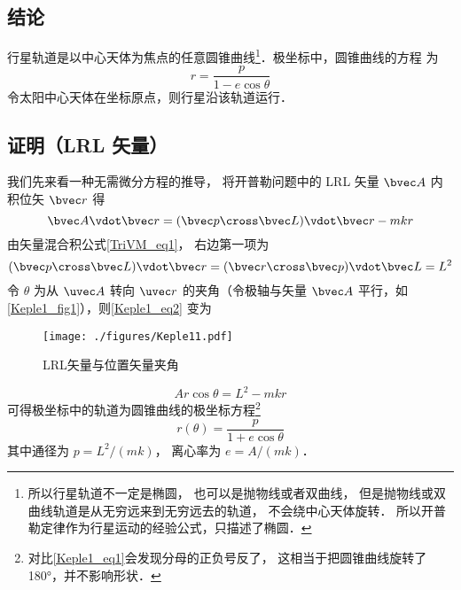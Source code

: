 

\subsection{结论}
行星轨道是以中心天体为焦点的任意圆锥曲线\footnote{所以行星轨道不一定是椭圆， 也可以是抛物线或者双曲线， 但是抛物线或双曲线轨道是从无穷远来到无穷远去的轨道， 不会绕中心天体旋转． 所以开普勒定律作为行星运动的经验公式，只描述了椭圆．}．极坐标中，圆锥曲线的方程
为
\begin{equation}\label{Keple1_eq1}
r = \frac{p}{1 - e \cos \theta }
\end{equation}
令太阳中心天体在坐标原点，则行星沿该轨道运行．

\subsection{证明（LRL 矢量）}

我们先来看一种无需微分方程的推导， 将开普勒问题中的 LRL 矢量 $\bvec A$ 内积位矢 $\bvec r$ 得
\begin{equation}\label{Keple1_eq2}
\bvec A \vdot \bvec r = (\bvec p \cross \bvec L)\vdot \bvec r - mkr
\end{equation}
由矢量混合积公式\autoref{TriVM_eq1}， 右边第一项为
\begin{equation}
(\bvec p \cross \bvec L)\vdot \bvec r = (\bvec r \cross \bvec p)\vdot \bvec L = L^2
\end{equation}
令 $\theta$ 为从 $\uvec A$ 转向 $\uvec r$ 的夹角（令极轴与矢量 $\bvec A$ 平行，如\autoref{Keple1_fig1}），则\autoref{Keple1_eq2} 变为
\begin{figure}[ht]
\centering
\texttt{[image: ./figures/Keple11.pdf]}
\caption{LRL矢量与位置矢量夹角} \label{Keple1_fig1}
\end{figure}
\begin{equation}
Ar\cos\theta = L^2 - mkr
\end{equation}
可得极坐标中的轨道为圆锥曲线的极坐标方程\footnote{对比\autoref{Keple1_eq1}会发现分母的正负号反了， 这相当于把圆锥曲线旋转了 180°，并不影响形状．}
\begin{equation}
r(\theta) = \frac{p}{1 + e\cos\theta}
\end{equation}
其中通径为 $p = L^2/(mk)$， 离心率为 $e = A/(mk)$．

